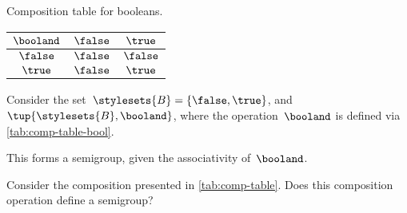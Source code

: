 \begin{margintable}
    \caption{Composition table for booleans.}
    \label{tab:comp-table-bool}
    \centering
    \begin{tabular}{c|cc}
        $\booland$ & $\false$ & $\true$ \\
        \hline
        $\false$   & $\false$ & $\false$ \\
        $\true$    & $\false$ & $\true$
    \end{tabular}
\end{margintable}

\begin{example}[Booleans]
    \label{exa:booleans-table}
    \label{ex:bool_semigroup}
    Consider the set~$\stylesets{B}=\{\false, \true\}$, and~$\tup{\stylesets{B},\booland}$, where the operation~$\booland$ is defined via \cref{tab:comp-table-bool}.

    This forms a semigroup, given the associativity of~$\booland$.
\end{example}

\begin{gradedexercise}
    \label{ex:CompositionTable}
    Consider the composition presented in \cref{tab:comp-table}.
    Does this composition operation define a semigroup?
\end{gradedexercise}

